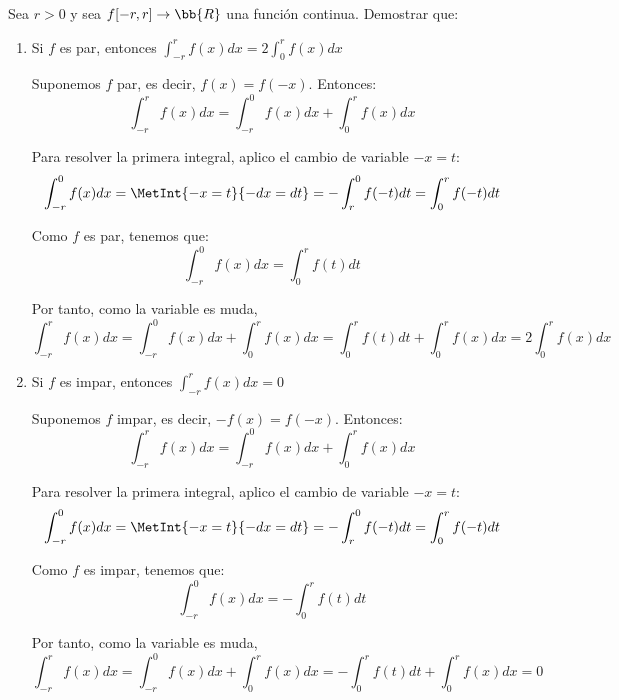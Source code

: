 \begin{ejercicio} Sea $r>0$ y sea $f[-r,r]\to\bb{R}$ una función continua. Demostrar que:
\begin{enumerate}
    \item Si $f$ es par, entonces $\int_{-r}^r f(x)dx = 2\int_0^r f(x)dx$

    Suponemos $f$ par, es decir, $f(x)=f(-x)$. Entonces:
    \begin{equation*}
        \int_{-r}^r f(x)dx = 
        \int_{-r}^0 f(x)dx + \int_0^r f(x)dx 
    \end{equation*}

    Para resolver la primera integral, aplico el cambio de variable $-x=t$:
    \begin{equation*}
        \int_{-r}^0 f(x)dx
        = \MetInt{-x=t}{-dx = dt}
        = -\int_{r}^{0} f(-t)dt
        = \int_{0}^{r} f(-t)dt
    \end{equation*}

    Como $f$ es par, tenemos que:
    \begin{equation*}
        \int_{-r}^0 f(x)dx
        = \int_{0}^{r} f(t)dt
    \end{equation*}

    Por tanto, como la variable es muda,
    \begin{equation*}
        \int_{-r}^r f(x)dx = 
        \int_{-r}^0 f(x)dx + \int_0^r f(x)dx 
        = \int_{0}^{r} f(t)dt + \int_0^r f(x)dx 
        = 2\int_0^r f(x)dx 
    \end{equation*}
    
    \item Si $f$ es impar, entonces $\int_{-r}^r f(x)dx = 0$

    Suponemos $f$ impar, es decir, $-f(x)=f(-x)$. Entonces:
    \begin{equation*}
        \int_{-r}^r f(x)dx = 
        \int_{-r}^0 f(x)dx + \int_0^r f(x)dx 
    \end{equation*}

    Para resolver la primera integral, aplico el cambio de variable $-x=t$:
    \begin{equation*}
        \int_{-r}^0 f(x)dx
        = \MetInt{-x=t}{-dx = dt}
        = -\int_{r}^{0} f(-t)dt
        = \int_{0}^{r} f(-t)dt
    \end{equation*}

    Como $f$ es impar, tenemos que:
    \begin{equation*}
        \int_{-r}^0 f(x)dx
        = -\int_{0}^{r} f(t)dt
    \end{equation*}

    Por tanto, como la variable es muda,
    \begin{equation*}
        \int_{-r}^r f(x)dx = 
        \int_{-r}^0 f(x)dx + \int_0^r f(x)dx 
        = -\int_{0}^{r} f(t)dt + \int_0^r f(x)dx 
        = 0
    \end{equation*}
    
\end{enumerate}
\end{ejercicio}


